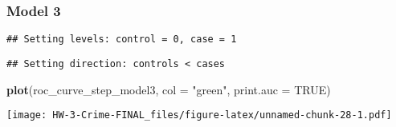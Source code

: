 \documentclass[
]{article}
\newenvironment{Shaded}{\begin{snugshade}}{\end{snugshade}}
\newcommand{\AttributeTok}[1]{\textcolor[rgb]{0.13,0.29,0.53}{#1}}
\newcommand{\ConstantTok}[1]{\textcolor[rgb]{0.56,0.35,0.01}{#1}}
\newcommand{\FunctionTok}[1]{\textcolor[rgb]{0.13,0.29,0.53}{\textbf{#1}}}
\newcommand{\NormalTok}[1]{#1}
\newcommand{\OtherTok}[1]{\textcolor[rgb]{0.56,0.35,0.01}{#1}}
\newcommand{\SpecialCharTok}[1]{\textcolor[rgb]{0.81,0.36,0.00}{\textbf{#1}}}
\newcommand{\StringTok}[1]{\textcolor[rgb]{0.31,0.60,0.02}{#1}}
\begin{document}
\hypertarget{model-3-1}{%
\subsubsection{Model 3}\label{model-3-1}}

\begin{Shaded}
\end{Shaded}

\begin{verbatim}
## Setting levels: control = 0, case = 1
\end{verbatim}

\begin{verbatim}
## Setting direction: controls < cases
\end{verbatim}

\begin{Shaded}
\begin{Highlighting}[]
\FunctionTok{plot}\NormalTok{(roc\_curve\_step\_model3, }\AttributeTok{col =} \StringTok{"green"}\NormalTok{, }\AttributeTok{print.auc =} \ConstantTok{TRUE}\NormalTok{)}
\end{Highlighting}
\end{Shaded}

\texttt{[image: HW-3-Crime-FINAL\_files/figure-latex/unnamed-chunk-28-1.pdf]}
\end{document}
